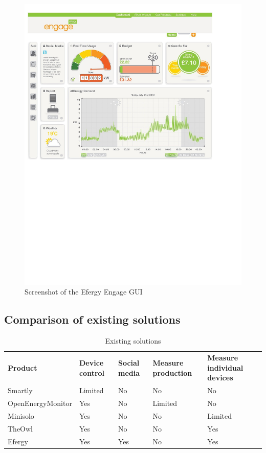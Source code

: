 \begin{figure}[H]
\centering
\includegraphics[width=\textwidth, trim=0.5cm 12cm 3cm 0.7cm, clip]{ch/prestudy/fig/efergy.pdf}
\caption{Screenshot of the Efergy Engage GUI}
\label{fig:efergyGUI}
\end{figure}

\subsection{Comparison of existing solutions}
\begin{table}[H]
\centering
{}
\begin{tabular}{|l|l|p{2.6cm}|p{2.3cm}|p{2.2cm}|}
\hline
\textbf{Product} & \textbf{Device control} & \textbf{Social media} & \textbf{Measure production} & \textbf{Measure individual devices} \\
Smartly & Limited & No  & No & No\\
OpenEnergyMonitor & Yes & No  & Limited & No \\
Minisolo & Yes & No  & No & Limited\\
TheOwl & Yes & No & No & Yes\\
Efergy & Yes & Yes &  No & Yes\\\hline
\end{tabular}
\caption{Existing solutions}
\label{tab:existingSolutions}
\end{table}
